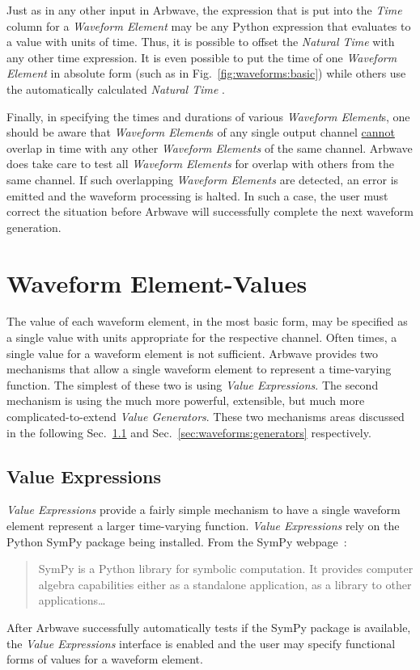 Just as in any other input in Arbwave, the expression that is put into
the \textit{Time} column for a \textit{Waveform Element} may be any Python
expression that evaluates to a value with units of time.  Thus, it is possible
to offset the \textit{Natural Time}  with any other time
expression.  It is even possible to put the time of one \textit{Waveform Element} in absolute
form (such as in Fig.~\ref{fig:waveforms:basic}) while others use the
automatically calculated \textit{Natural Time} .

Finally, in specifying the times and durations of various \textit{Waveform
Element}s, one should be aware that \textit{Waveform Element}s of any single
output channel \underline{cannot} overlap in time with any other
\textit{Waveform Elements} of the same channel.  Arbwave does take care to test
all \textit{Waveform Elements} for overlap with others from the same channel.
If such overlapping \textit{Waveform Elements} are detected, an error is emitted
and the waveform processing is halted.  In such a case, the user must correct
the situation before Arbwave will successfully complete the next waveform
generation.



\section{Waveform Element-Values}\label{sec:waveforms:value}

The value of each waveform element, in the most basic form, may be specified as
a single value with units appropriate for the respective channel.
%
Often times, a single value for a waveform element is not sufficient.  Arbwave
provides two mechanisms that allow a single waveform element to represent a
time-varying function.  The simplest of these two is using \textit{Value
Expressions}.  The second mechanism is using the much more powerful, extensible,
but much more complicated-to-extend \textit{Value Generators}.  These two
mechanisms areas discussed in the following Sec.~\ref{sec:waveforms:expr} and
Sec.~\ref{sec:waveforms:generators} respectively.


\subsection{Value Expressions}\label{sec:waveforms:expr}
\textit{Value Expressions} provide a fairly simple mechanism to have a single
waveform element represent a larger time-varying function.  \textit{Value
Expressions} rely on the Python SymPy package being installed.  From the SymPy
webpage~\cite{sympy}:
\begin{quote}
SymPy is a Python library for symbolic computation. It provides computer algebra
capabilities either as a standalone application, as a library to other
applications\ldots
\end{quote}
After Arbwave successfully automatically tests if the SymPy package is
available, the \textit{Value Expressions} interface is enabled and the user may
specify functional forms of values for a waveform element.

